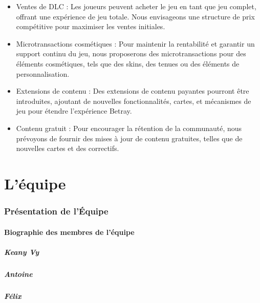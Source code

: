 \documentclass[
	article,			%
	11pt,				%
	oneside,			%
	a4paper,			%
	chapter=TITLE,
	french,			%
	sumario=tradicional
	]{base_nt}
\begin{document}
\begin{itemize}
    \item Ventes de DLC : Les joueurs peuvent acheter le jeu en tant que jeu complet, offrant une expérience de jeu totale. Nous envisageons une structure de prix compétitive pour maximiser les ventes initiales.
    \item Microtransactions cosmétiques : Pour maintenir la rentabilité et garantir un support continu du jeu, nous proposerons des microtransactions pour des éléments cosmétiques, tels que des skins, des tenues ou des éléments de personnalisation.
    \item Extensions de contenu : Des extensions de contenu payantes pourront être introduites, ajoutant de nouvelles fonctionnalités, cartes, et mécanismes de jeu pour étendre l'expérience Betray.
    \item Contenu gratuit : Pour encourager la rétention de la communauté, nous prévoyons de fournir des mises à jour de contenu gratuites, telles que de nouvelles cartes et des correctifs.
\end{itemize}

\part{L'équipe}

\section{Présentation de l'Équipe}

\subsection{Biographie des membres de l'équipe}

\subsubsection{Keany Vy}


\subsubsection{Antoine}


\subsubsection{Félix}
\end{document}
